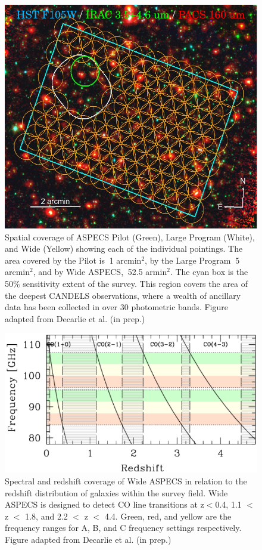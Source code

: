 \begin{figure}[!htbp]
\centering \includegraphics[width=120mm]{Wide_ASPECS_Coverage.png}
\caption{Spatial coverage of ASPECS Pilot (Green), Large Program (White), and Wide (Yellow) showing each of the individual pointings. The area covered by the Pilot is $~$1 arcmin$^2$, by the Large Program $~$5 arcmin$^2$, and by Wide ASPECS, $~$52.5 armin$^2$. The cyan box is the 50\% sensitivity extent of the survey. This region covers the area of the deepest CANDELS observations, where a wealth of ancillary data has been collected in over 30 photometric bands. Figure adapted from Decarlie et al. (in prep.)} %
\label{fig:ASPECS_Coverage}
\end{figure}

\begin{figure}[!htbp]
\centering
\includegraphics[width=120mm]{Wide_ASPECS_Freq.png}
\caption{Spectral and redshift coverage of Wide ASPECS in relation to the redshift distribution of galaxies within the survey field. Wide ASPECS is designed to detect CO line transitions at z$<$0.4, 1.1 $<$ z $<$ 1.8, and 2.2 $<$ z $<$ 4.4. Green, red, and yellow are the frequency ranges for A, B, and C frequency settings respectively. Figure adapted from Decarlie et al. (in prep.)}
\label{fig:ASPECS_Freq}
\end{figure}

